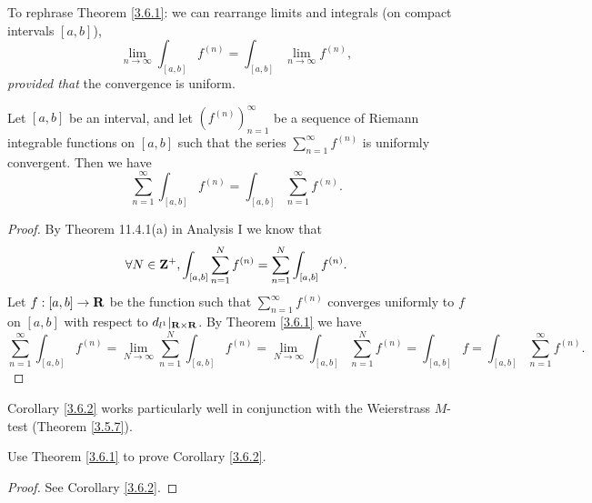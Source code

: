 \begin{note}
    To rephrase Theorem \ref{3.6.1}:
    we can rearrange limits and integrals (on compact intervals \([a, b]\)),
    \[
        \lim_{n \to \infty} \int_{[a, b]} f^{(n)} = \int_{[a, b]} \lim_{n \to \infty} f^{(n)},
    \]
    \emph{provided that} the convergence is uniform.
\end{note}

\begin{corollary}\label{3.6.2}
    Let \([a, b]\) be an interval, and let \((f^{(n)})_{n = 1}^\infty\) be a sequence of Riemann integrable functions on \([a, b]\) such that the series \(\sum_{n = 1}^\infty f^{(n)}\) is uniformly convergent.
    Then we have
    \[
        \sum_{n = 1}^\infty \int_{[a, b]} f^{(n)} = \int_{[a, b]} \sum_{n = 1}^\infty f^{(n)}.
    \]
\end{corollary}

\begin{proof}
    By Theorem 11.4.1(a) in Analysis I we know that
    \[
        \forall N \in \mathbf{Z}^+, \int_{[a, b]} \sum_{n = 1}^N f^{(n)} = \sum_{n = 1}^N \int_{[a, b]} f^{(n)}.
    \]
    Let \(f : [a, b] \to \mathbf{R}\) be the function such that \(\sum_{n = 1}^\infty f^{(n)}\) converges uniformly to \(f\) on \([a, b]\) with respect to \(d_{l^1}|_{\mathbf{R} \times \mathbf{R}}\).
    By Theorem \ref{3.6.1} we have
    \[
        \sum_{n = 1}^\infty \int_{[a, b]} f^{(n)} = \lim_{N \to \infty} \sum_{n = 1}^N \int_{[a, b]} f^{(n)} = \lim_{N \to \infty} \int_{[a, b]} \sum_{n = 1}^N f^{(n)} = \int_{[a, b]} f = \int_{[a, b]} \sum_{n = 1}^\infty f^{(n)}.
    \]
\end{proof}

\begin{note}
    Corollary \ref{3.6.2} works particularly well in conjunction with the Weierstrass \(M\)-test
    (Theorem \ref{3.5.7}).
\end{note}

\exercisesection

\begin{exercise}\label{ex 3.6.1}
    Use Theorem \ref{3.6.1} to prove Corollary \ref{3.6.2}.
\end{exercise}

\begin{proof}
    See Corollary \ref{3.6.2}.
\end{proof}